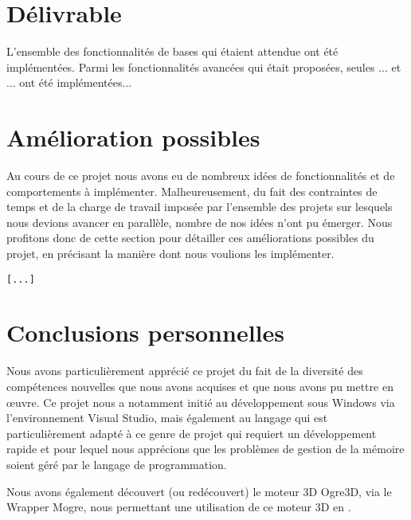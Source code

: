 \section{Délivrable}

L'ensemble des fonctionnalités de bases qui étaient attendue ont été
implémentées. Parmi les fonctionnalités avancées qui était proposées, seules
... et ... ont été implémentées...

\section{Amélioration possibles}

Au cours de ce projet nous avons eu de nombreux idées de fonctionnalités et de
comportements à implémenter. Malheureusement, du fait des contraintes de temps
et de la charge de travail imposée par l'ensemble des projets sur lesquels
nous devions avancer en parallèle, nombre de nos idées n'ont pu émerger. Nous
profitons donc de cette section pour détailler ces améliorations possibles du
projet, en précisant la manière dont nous voulions les implémenter.

\verb![...]!

\section{Conclusions personnelles}

Nous avons particulièrement apprécié ce projet du fait de la diversité des
compétences nouvelles que nous avons acquises et que nous avons pu mettre en
œuvre. Ce projet nous a notamment initié au développement sous Windows via
l'environnement Visual Studio, mais également au langage \CS qui est
particulièrement adapté à ce genre de projet qui requiert un développement
rapide et pour lequel nous apprécions que les problèmes de gestion de la
mémoire soient géré par le langage de programmation.

Nous avons également découvert (ou redécouvert) le moteur 3D Ogre3D, via le
Wrapper Mogre, nous permettant une utilisation de ce moteur 3D en \CS.
